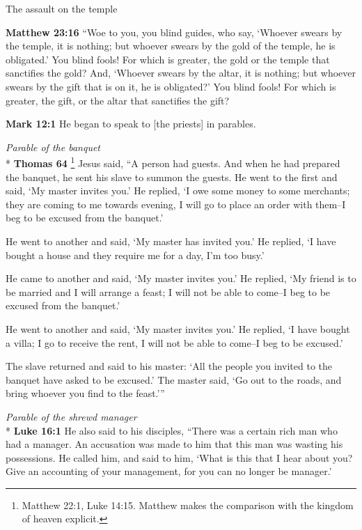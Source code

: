 \documentclass[10pt,twoside]{article} %
\newcommand{\quotesize}{\normalsize{}}
\newenvironment{quotetext}{\begingroup\quotesize}{\endgroup}
\newcommand{\intex}[1]{\index[texts]{#1}}
\newcommand{\bible}[2]{\begin{quotetext}\textbf{#1}\intex{#1} #2\end{quotetext}}
\newcommand{\matthew}[2]{\bible{Matthew #1}{#2}}
\newcommand{\gospelmark}[2]{\bible{Mark #1}{#2}}
\newcommand{\luke}[2]{\bible{Luke #1}{#2}}
\newcommand{\thomas}[2]{\bible{Thomas #1}{#2}}
\newcommand{\subhead}[1]{\emph{#1}\\*}
\begin{document}
\begin{section}{The assault on the temple}

\matthew{23:16}{
``Woe to you, you blind guides, who say, `Whoever swears by the temple, it is nothing; but whoever swears by the gold of the temple, he is obligated.'    You blind fools! For which is greater, the gold or the temple that sanctifies the gold?    And, `Whoever swears by the altar, it is nothing; but whoever swears by the gift that is on it, he is obligated?'    You blind fools! For which is greater, the gift, or the altar that sanctifies the gift?
}

\gospelmark{12:1}{
   He began to speak to [the priests] in parables.}

\subhead{Parable of the banquet}
\thomas{64}{\footnote{Matthew 22:1, Luke 14:15. Matthew makes the comparison with the kingdom of heaven explicit.}
Jesus said, ``A person had guests. And when he had prepared the banquet, he sent his
slave to summon the guests. He went to the first and said, `My
master invites you.' He replied, `I owe some money to some merchants;
they are coming to me towards evening, I will go to place an order
with them--I beg to be excused from the banquet.'

He went to another and said,
`My master has invited you.' He replied, `I
have bought a house and they require me for a day, I'm too busy.'

He came to another and said, `My master
invites you.' He replied, `My friend is to be married and I
will arrange a feast; I will not be able to come--I beg to be
excused from the banquet.'

He went to another and said, `My
master invites you.' He replied, `I have bought a villa; I go
to receive the rent, I will not be able to come--I beg to be
excused.'

The slave returned and said to his master: `All the people you
invited to the banquet have asked to be excused.' The master said,
`Go out to the roads, and bring whoever you find
to the feast.'{}''
}


\subhead{Parable of the shrewd manager}
\luke{16:1}{
He also said to his disciples, ``There was a certain rich man who had a manager. An accusation was made to him that this man was wasting his possessions.  
  He called him, and said to him, `What is this that I hear about you? Give an accounting of your management, for you can no longer be manager.'

}
\end{section}
\end{document}
